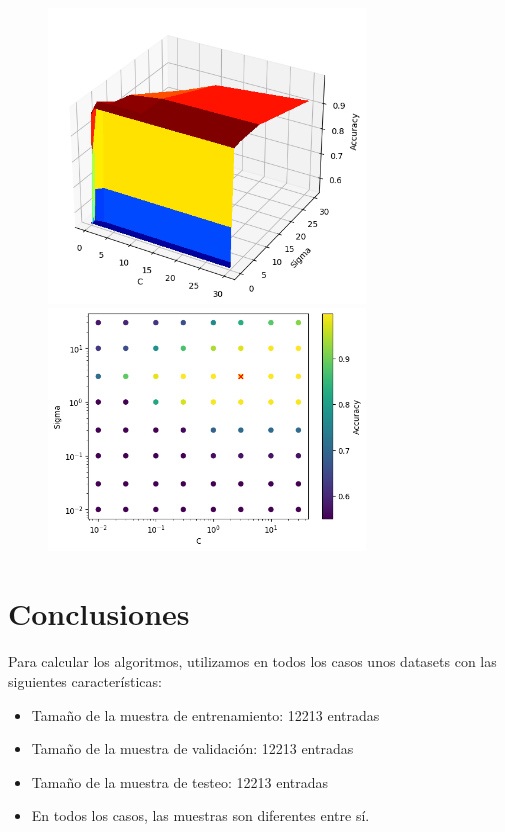 \documentclass[11pt]{article}
\begin{document}
 \begin{figure}[H]
    \begin{center}
    \includegraphics[width=0.75\textwidth]{Results/SVM/SVM_1.png}
    \includegraphics[width=0.75\textwidth]{Results/SVM/SVM_2.png}
    \end{center}
 \end{figure}

\newpage
\section{Conclusiones}

Para calcular los algoritmos, utilizamos en todos los casos unos datasets con las siguientes características:

\begin{itemize}
\item Tamaño de la muestra de entrenamiento: 12213 entradas
\item Tamaño de la muestra de validación: 12213 entradas
\item Tamaño de la muestra de testeo: 12213 entradas
\item En todos los casos, las muestras son diferentes entre sí. 
\end{itemize}
\end{document}
